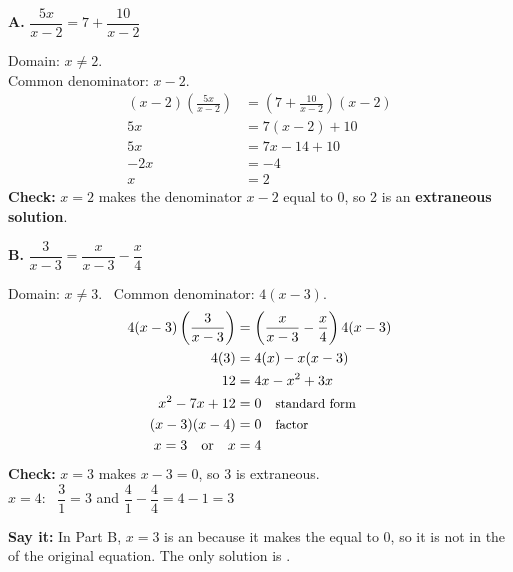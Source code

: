 \begin{minipage}[t]{0.45\textwidth}
\vspace{0pt}\raggedright
\textbf{A.} $\dfrac{5x}{x-2}=7+\dfrac{10}{x-2}$

{\small Domain: $x\neq2$.\\ Common denominator: $x-2$.}
\begin{align*}
(x-2)\left(\frac{5x}{x-2}\right)&=\left(7+\frac{10}{x-2}\right)(x-2)\\
5x&=7(x-2)+10\\
5x&=7x-14+10\\
-2x&=-4\\
x&=2
\end{align*}
\textbf{Check:} $x=2$ makes the denominator $x-2$ equal to 0, so 2 is an \textbf{extraneous solution}.

\end{minipage}\hfill
\begin{minipage}[t]{0.51\textwidth}
\vspace{0pt}\raggedright
\textbf{B.} $\dfrac{3}{x-3}=\dfrac{x}{x-3}-\dfrac{x}{4}$

{\small Domain: $x\neq3$. \ Common denominator: $4(x-3)$.}
\begin{align*}
4(x-3)\left(\frac{3}{x-3}\right)&=\left(\frac{x}{x-3}-\frac{x}{4}\right)4(x-3)\\
4(3)&=4(x)-x(x-3)\\
12&=4x-x^2+3x\\
x^2-7x+12&=0 \quad \text{\small standard form}\\
(x-3)(x-4)&=0 \quad \text{\small factor}\\
x=3 \quad\text{or}\quad x&=4
\end{align*}
\textbf{Check:} $x=3$ makes $x-3=0$, so 3 is extraneous.\\
$x=4$: \ $\dfrac{3}{1}=3$ and $\dfrac{4}{1}-\dfrac{4}{4}=4-1=3$ \checkmark

\end{minipage}

\vspace{2pt}

\textbf{Say it:} In Part B, $x=3$ is an \blank[3.4cm] because it makes the \blank[2.6cm] equal to 0, so it is not in the \blank[2cm] of the original equation. The only solution is \blank[1.6cm].

